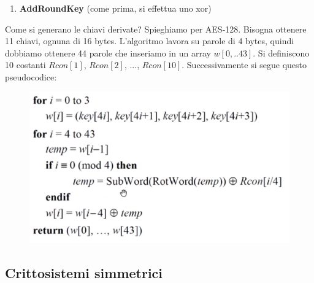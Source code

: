 \begin{itemize}
\begin{enumerate}
			\item \textbf{AddRoundKey} (come prima, si effettua uno xor)
		\end{enumerate} 
		
	Come si generano le chiavi derivate? Spieghiamo per AES-128.
	Bisogna ottenere 11 chiavi, ognuna di 16 bytes. L'algoritmo lavora su parole di 4 bytes, quindi dobbiamo ottenere 44 parole che inseriamo in un array $w[0,..43]$. Si definiscono 10 costanti $Rcon[1]$, $Rcon[2]$, ..., $Rcon[10]$. Successivamente si segue questo pseudocodice:
	
		\begin{figure}[h]
		\centering
		\includegraphics[width=0.9\linewidth]{immagini/img36}
	\end{figure}

\subsection*{Crittosistemi simmetrici}


\end{itemize}
